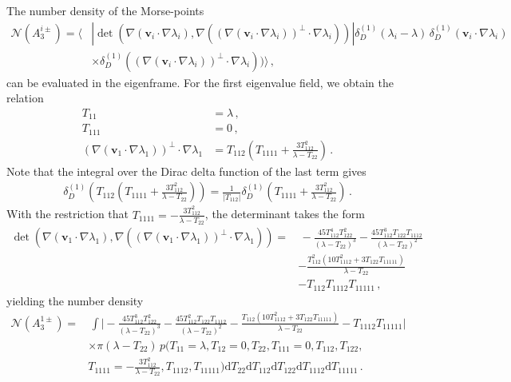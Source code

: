 \documentclass[a4paper, 11pt]{article}
\begin{document}
The number density of the Morse-points 
\begin{align}
\mathcal{N}(A_3^{i\pm}) 
= \bigg \langle &\left|\det\left(\nabla (\bm{v}_i \cdot \nabla \lambda_i), \nabla ((\nabla (\bm{v}_i \cdot \nabla \lambda_i))^\perp \cdot \nabla \lambda_i)\right)\right| \delta_D^{(1)}(\lambda_i - \lambda)\, \delta_D^{(1)}(\bm{v}_i \cdot \nabla \lambda_i) \nonumber\\
&\times \delta_D^{(1)}((\nabla(\bm{v}_i \cdot \nabla \lambda_i))^\perp \cdot \nabla \lambda_i)) \bigg \rangle\,,
\end{align}
can be evaluated in the eigenframe. For the first eigenvalue field, we obtain the relation
\begin{align}
T_{11}&=\lambda\,,\\
T_{111}&=0\,,\\
(\nabla(\bm{v}_1 \cdot \nabla \lambda_1))^\perp \cdot \nabla \lambda_1 
&=T_{112} \left(T_{1111}+\frac{3T_{112}^2}{\lambda-T_{22}}\right)\,.
\end{align}
Note that the integral over the Dirac delta function of the last term gives
\begin{align}
\delta_D^{(1)}\left(T_{112} \left(T_{1111}+\frac{3T_{112}^2}{\lambda-T_{22}}\right)\right) =
\frac{1}{|T_{112}|}\delta_D^{(1)}\left(T_{1111}+\frac{3T_{112}^2}{\lambda-T_{22}}\right)\,.
\end{align}
With the restriction that $T_{1111}=-\frac{3T_{112}^2}{\lambda-T_{22}}$, the determinant takes the form
\begin{align}
\det\left(\nabla (\bm{v}_1 \cdot \nabla \lambda_1), \nabla ((\nabla (\bm{v}_1 \cdot \nabla \lambda_1))^\perp \cdot \nabla \lambda_1)\right)=&\,
-\frac{45 T_{112}^4 T_{122}^2}{(\lambda-T_{22})^3}
-\frac{45 T_{112}^3T_{122}T_{1112}}{(\lambda-T_{22})^2}\nonumber\\
&
-\frac{T_{112}^2(10T_{1112}^2 + 3 T_{122}T_{11111})}{\lambda-T_{22}}\nonumber\\
&-T_{112}T_{1112}T_{11111}\,,
\end{align}
yielding the number density
\begin{align}
\mathcal{N}(A_3^{1\pm}) 
=&\, \int \bigg|
-\frac{45 T_{112}^3 T_{122}^2}{(\lambda-T_{22})^3}
-\frac{45 T_{112}^2T_{122}T_{1112}}{(\lambda-T_{22})^2}
-\frac{T_{112}(10T_{1112}^2 + 3 T_{122}T_{11111})}{\lambda-T_{22}}
-T_{1112}T_{11111}
\bigg| \nonumber\\
&\times \pi(\lambda-T_{22})\,p(T_{11}=\lambda,T_{12}=0,T_{22},T_{111}=0,T_{112},T_{122},\nonumber\\
&T_{1111}=-\frac{3T_{112}^2}{\lambda-T_{22}},T_{1112},T_{11111})\mathrm{d}T_{22}\mathrm{d}T_{112}\mathrm{d}T_{122}\mathrm{d}T_{1112}\mathrm{d}T_{11111}\,.
\end{align}
\end{document}
